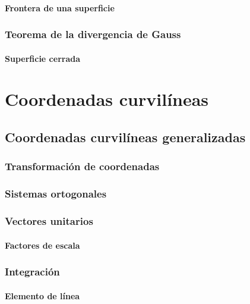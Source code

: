 \documentclass[12pt, fleqn]{report}                             %
\begin{document}
            \subsection{Frontera de una superficie}
        
        \section{Teorema de la divergencia de Gauss}
        
            \subsection{Superficie cerrada}


\part{Coordenadas curvilíneas}

    \chapter{Coordenadas curvilíneas generalizadas}
    
        \section{Transformación de coordenadas}
        
        \section{Sistemas ortogonales}
        
        \section{Vectores unitarios}
        
            \subsection{Factores de escala}
        
        \section{Integración}
        
            \subsection{Elemento de línea}
            
\end{document}
